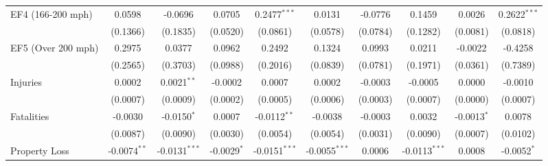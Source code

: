 \documentclass[letterpaper]{article}
\begin{document}
\begin{table}[H]
{\begin{tabular}{lccccccccc}
  EF4 (166-200 mph)      & 0.0598                         & -0.0696                       & 0.0705                          & 0.2477$^{***}$                  & 0.0131                    & -0.0776                       & 0.1459                   & 0.0026                  & 0.2622$^{***}$\\   
                        & (0.1366)                       & (0.1835)                      & (0.0520)                        & (0.0861)                        & (0.0578)                  & (0.0784)                      & (0.1282)                 & (0.0081)                & (0.0818)\\   
   EF5 (Over 200 mph)      & 0.2975                         & 0.0377                        & 0.0962                          & 0.2492                          & 0.1324                    & 0.0993                        & 0.0211                   & -0.0022                 & -0.4258\\   
                        & (0.2565)                       & (0.3703)                      & (0.0988)                        & (0.2016)                        & (0.0839)                  & (0.0781)                      & (0.1971)                 & (0.0361)                & (0.7389)\\   
   Injuries                  & 0.0002                         & 0.0021$^{**}$                 & -0.0002                         & 0.0007                          & 0.0002                    & -0.0003                       & -0.0005                  & 0.0000    & -0.0010\\   
                        & (0.0007)                       & (0.0009)                      & (0.0002)                        & (0.0005)                        & (0.0006)                  & (0.0003)                      & (0.0007)                 & (0.0000)  & (0.0007)\\   
   Fatalities                  & -0.0030                        & -0.0150$^{*}$                 & 0.0007                          & -0.0112$^{**}$                  & -0.0038                   & -0.0003                       & 0.0032                   & -0.0013$^{*}$           & 0.0078\\   
                        & (0.0087)                       & (0.0090)                      & (0.0030)                        & (0.0054)                        & (0.0054)                  & (0.0031)                      & (0.0090)                 & (0.0007)                & (0.0102)\\   
   Property Loss                 & -0.0074$^{**}$                 & -0.0131$^{***}$               & -0.0029$^{*}$                   & -0.0151$^{***}$                 & -0.0055$^{***}$           & 0.0006                        & -0.0113$^{***}$          & 0.0008                  & -0.0052$^{*}$\\   

\end{tabular}}
\end{table}
\end{document}
